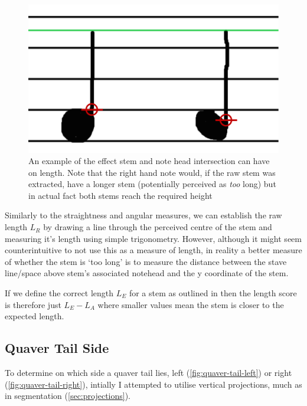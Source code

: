\begin{figure}[h!]
    \centering
    \includegraphics[width=.8\textwidth]{gfx/techniques/stem-intersection-labelled.png}
    \caption{An example of the effect stem and note head intersection can have on length. Note that the right hand note would, if the raw stem was extracted, have a longer stem (potentially perceived as \emph{too} long) but in actual fact both stems reach the required height}
    \label{fig:stem-intersection}
\end{figure}

Similarly to the straightness and angular measures, we can establish the raw length $L_R$ by drawing a line through the perceived centre of the stem and measuring it's length using simple trigonometry. However, although it might seem counterintuitive to not use this as a measure of length, in reality a better measure of whether the stem is `too long' is to measure the distance between the stave line/space above stem's associated notehead and the y coordinate of the stem.

If we define the correct length $L_E$ for a stem as outlined in  then the length score is therefore just $L_E - L_A$ where smaller values mean the stem is closer to the expected length.

\subsection{Quaver Tail Side}


To determine on which side a quaver tail lies, left (\cref{fig:quaver-tail-left}) or right (\cref{fig:quaver-tail-right}), intially I attempted to utilise vertical projections, much as in segmentation (\cref{sec:projections}).

